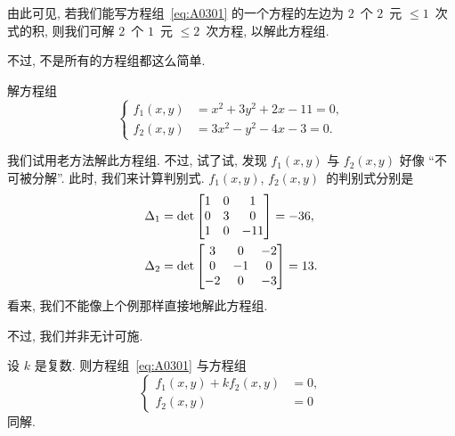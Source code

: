 \documentclass[../libro.tex]{subfiles}
\begin{document}
由此可见, 若我们能写方程组~\eqref{eq:A0301}
的一个方程的左边为 \(2\)~个 \(2\)~元 \({\leq} 1\)~次式的积,
则我们可解 \(2\)~个 \(1\)~元 \({\leq} 2\)~次方程,
以解此方程组.

不过, 不是所有的方程组都这么简单.

\begin{example}\label{emp:A0301}
    解方程组
    \begin{equation*}
        \left\{ %
        \begin{aligned}
            f_1 (x, y) & = x^2 + 3y^2 + 2x - 11 = 0, \\
            f_2 (x, y) & = 3x^2 - y^2 - 4x - 3 = 0.
        \end{aligned}
        \right. %
    \end{equation*}

    我们试用老方法解此方程组.
    不过, 试了试, 发现
    \(f_1 (x, y)\) 与 \(f_2 (x, y)\)
    好像 ``不可被分解''.
    此时, 我们来计算判别式.
    \(f_1 (x, y)\), \(f_2 (x, y)\)~的判别式分别是
    \begin{align*}
        & \Delta_1 =
         \det
        \begin{bmatrix}
            1 & 0 & 1   \\
            0 & 3 & 0   \\
            1 & 0 & -11 \\
        \end{bmatrix} 
        = -36,
        \\
        & \Delta_2 =
         \det
        \begin{bmatrix}
            3  & 0  & -2 \\
            0  & -1 & 0  \\
            -2 & 0  & -3 \\
        \end{bmatrix} 
        = 13.
    \end{align*}
    看来, 我们不能像上个例那样直接地解此方程组.
\end{example}

不过, 我们并非无计可施.

\begin{theorem}
    设 \(k\) 是复数.
    则方程组~\eqref{eq:A0301}
    与方程组
    \begin{equation}
        \left\{ %
        \begin{aligned}
            f_1 (x, y) + kf_2 (x, y) & = 0, \\
            f_2 (x, y)               & = 0
        \end{aligned}
        \right. %
        \label{eq:A0302}
    \end{equation}
    同解.
\end{theorem}
\end{document}
